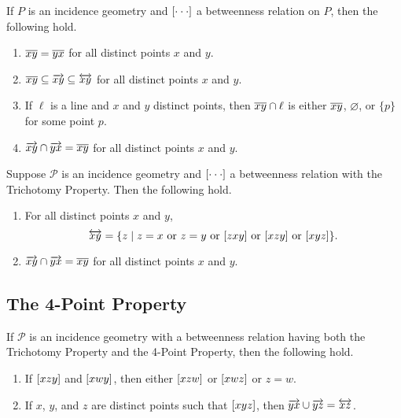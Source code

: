 \begin{prop}
If $P$ is an incidence geometry and $[ \cdot \cdot \cdot ]$ a betweenness relation on $P$, then the following hold.
\begin{enumerate}
\item $\overline{xy} = \overline{yx}$ for all distinct points $x$ and $y$.
\item $\overline{xy} \subseteq \overrightarrow{xy} \subseteq \overleftrightarrow{xy}$ for all distinct points $x$ and $y$.
\item If $\ell$ is a line and $x$ and $y$ distinct points, then $\overline{xy} \cap \ell$ is either $\overline{xy}$, $\varnothing$, or $\{p\}$ for some point $p$.
\item $\overrightarrow{xy} \cap \overrightarrow{yx} = \overline{xy}$ for all distinct points $x$ and $y$.
\end{enumerate}
\end{prop}



\begin{prop}
Suppose $\mathcal{P}$ is an incidence geometry and $[ \cdot \cdot \cdot ]$ a betweenness relation with the Trichotomy Property. Then the following hold.
\begin{enumerate}
\item For all distinct points $x$ and $y$, \[ \LINE{x}{y} = \{ z \mid z = x\ \mathrm{or}\ z = y\ \mathrm{or}\ \BETWEEN{z}{x}{y}\ \mathrm{or}\ \BETWEEN{x}{z}{y}\ \mathrm{or}\ \BETWEEN{x}{y}{z} \}. \]
\item $\overrightarrow{xy} \cap \overrightarrow{yx} = \overline{xy}$ for all distinct points $x$ and $y$.
\end{enumerate}
\end{prop}



\subsection*{The 4-Point Property}


\begin{prop}
If $\mathcal{P}$ is an incidence geometry with a betweenness relation having both the Trichotomy Property and the 4-Point Property, then the following hold.
\begin{enumerate}
\item If $[ x z y ]$ and $[ x w y ]$, then either $[ x z w ]$ or $[ x w z ]$ or $z = w$.
\item If $x$, $y$, and $z$ are distinct points such that $[ x y z ]$, then $\overrightarrow{yx} \cup \overrightarrow{yz} = \overleftrightarrow{xz}$.
\end{enumerate}
\end{prop}

